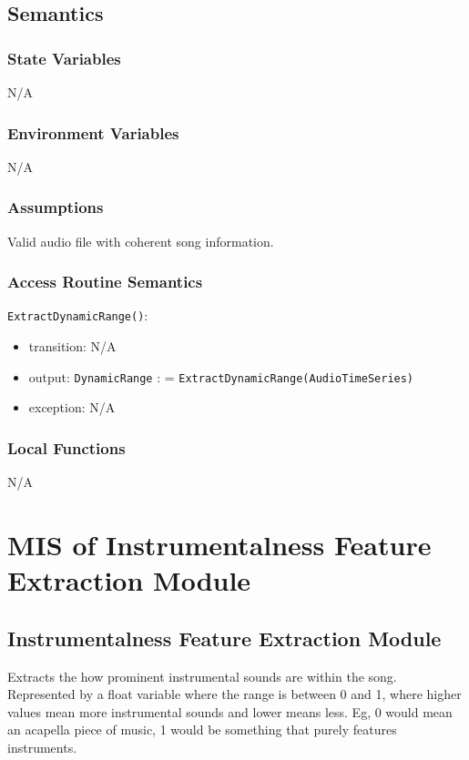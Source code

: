 \documentclass[12pt, titlepage]{article}
\begin{document}
\subsection{Semantics}

\subsubsection{State Variables}
N/A

\subsubsection{Environment Variables}
N/A

\subsubsection{Assumptions}
Valid audio file with coherent song information.

\subsubsection{Access Routine Semantics}

\noindent \texttt{ExtractDynamicRange()}:
\begin{itemize}
\item transition: N/A
\item output: \texttt{Dynamic\textunderscore Range} : = \texttt{ExtractDynamicRange(Audio\textunderscore Time\textunderscore Series)}
\item exception: N/A
\end{itemize}

\subsubsection{Local Functions}
N/A

\section{MIS of Instrumentalness Feature Extraction Module} 

\subsection{Instrumentalness Feature Extraction Module}
Extracts the how prominent instrumental sounds are within the song. Represented by a float
variable where the range is between 0 and 1, where higher values mean more instrumental sounds
and lower means less. Eg, 0 would mean an acapella piece of music, 1 would be something that purely
features instruments.  
\end{document}
